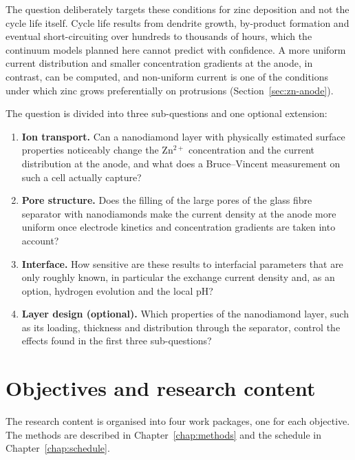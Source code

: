 The question deliberately targets these conditions for zinc deposition and not the cycle life itself.
Cycle life results from dendrite growth, by-product formation and eventual short-circuiting over hundreds to thousands of hours, which the continuum models planned here cannot predict with confidence.
A more uniform current distribution and smaller concentration gradients at the anode, in contrast, can be computed, and non-uniform current is one of the conditions under which zinc grows preferentially on protrusions (Section~\ref{sec:zn-anode}).

The question is divided into three sub-questions and one optional extension:
\begin{enumerate}
  \item \textbf{Ion transport.} Can a nanodiamond layer with physically estimated surface properties noticeably change the Zn$^{2+}$ concentration and the current distribution at the anode, and what does a Bruce--Vincent measurement on such a cell actually capture?
  \item \textbf{Pore structure.} Does the filling of the large pores of the glass fibre separator with nanodiamonds make the current density at the anode more uniform once electrode kinetics and concentration gradients are taken into account?
  \item \textbf{Interface.} How sensitive are these results to interfacial parameters that are only roughly known, in particular the exchange current density and, as an option, hydrogen evolution and the local pH?
  \item \textbf{Layer design (optional).} Which properties of the nanodiamond layer, such as its loading, thickness and distribution through the separator, control the effects found in the first three sub-questions?
\end{enumerate}

\section{Objectives and research content}

The research content is organised into four work packages, one for each objective.
The methods are described in Chapter~\ref{chap:methods} and the schedule in Chapter~\ref{chap:schedule}.

